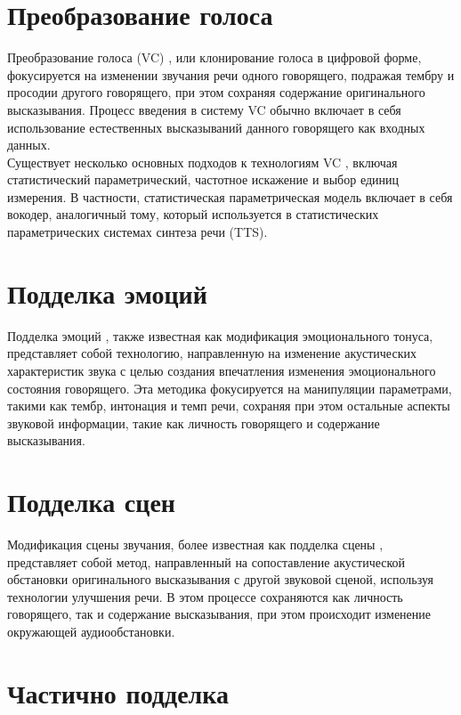 \section{Преобразование голоса} 

Преобразование голоса (VC) \cite{wu2015spoofing}, или клонирование голоса в цифровой форме, фокусируется на изменении звучания речи одного говорящего, подражая тембру и просодии другого говорящего, при этом сохраняя содержание оригинального высказывания. Процесс введения в систему VC обычно включает в себя использование естественных высказываний данного говорящего как входных данных.\\

Существует несколько основных подходов к технологиям VC \cite{sisman2020overview}, включая статистический параметрический, частотное искажение и выбор единиц измерения. В частности, статистическая параметрическая модель включает в себя вокодер, аналогичный тому, который используется в статистических параметрических системах синтеза речи (TTS).
\section{Подделка эмоций}


Подделка эмоций \cite{zhao2022emofake}, также известная как модификация эмоционального тонуса, представляет собой технологию, направленную на изменение акустических характеристик звука с целью создания впечатления изменения эмоционального состояния говорящего. Эта методика фокусируется на манипуляции параметрами, такими как тембр, интонация и темп речи, сохраняя при этом остальные аспекты звуковой информации, такие как личность говорящего и содержание высказывания.

\section{Подделка сцен}

Модификация сцены звучания, более известная как подделка сцены \cite{yi2022scenefake}, представляет собой метод, направленный на сопоставление акустической обстановки оригинального высказывания с другой звуковой сценой, используя технологии улучшения речи. В этом процессе сохраняются как личность говорящего, так и содержание высказывания, при этом происходит изменение окружающей аудиообстановки.

\section{Частично подделка}

